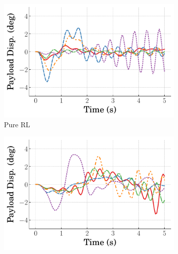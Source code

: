 %
\begin{figure}[tb]
    \centering
    \begin{subfigure}[b]{0.49\textwidth}
        \centering
        \includegraphics[width=\textwidth]{figures/figures_RL_model_based_control/time_responses_crane/dpcrane_pure_RL/Payload_displacement_-0p185_init_300000_steps.pdf}
        \caption{Pure RL}
        \label{subfig_chap2:dpcrane_neg_payload_resp_300000steps_pure_RL}
    \end{subfigure}
    \hfill
    \begin{subfigure}[b]{0.49\textwidth}
	    \centering
	    \includegraphics[width=\textwidth]{figures/figures_RL_model_based_control/time_responses_crane/dpcrane_cont_gain_sched/Payload_displacement_-0p185_init_300000_steps.pdf}

\end{subfigure}
\end{figure}
